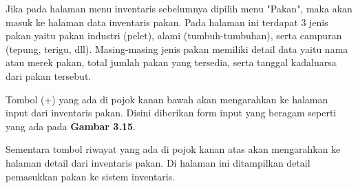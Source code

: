 \begin{enumerate}
\begin{enumerate}
		Jika pada halaman menu inventaris sebelumnya dipilih menu "Pakan", maka akan masuk ke halaman data inventaris pakan. Pada halaman ini terdapat 3 jenis pakan yaitu pakan industri (pelet), alami (tumbuh-tumbuhan), serta campuran (tepung, terigu, dll). Masing-masing jenis pakan memiliki detail data yaitu nama atau merek pakan, total jumlah pakan yang tersedia, serta tanggal kadaluarsa dari pakan tersebut.

		Tombol (+) yang ada di pojok kanan bawah akan mengarahkan ke halaman input dari inventaris pakan. Disini diberikan form input yang beragam seperti yang ada pada \textbf{Gambar 3.15}.

		Sementara tombol riwayat yang ada di pojok kanan atas akan mengarahkan ke halaman detail dari inventaris pakan. Di halaman ini ditampilkan detail pemasukkan pakan ke sistem inventaris.


\end{enumerate}
\end{enumerate}
